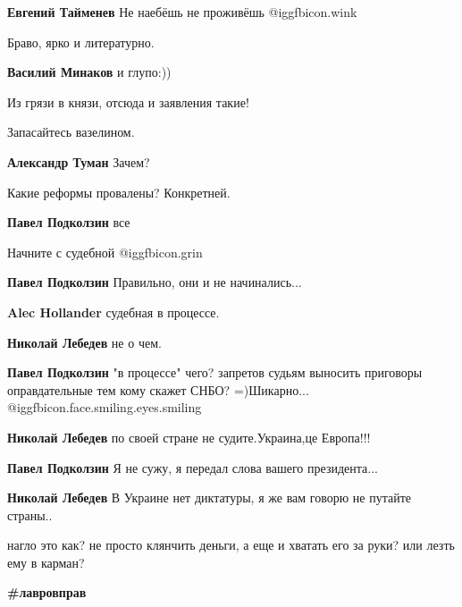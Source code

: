 \begin{itemize}
\begin{itemize}
\textbf{Евгений Тайменев} Не наебёшь не проживёшь  @igg{fbicon.wink} 
\end{itemize} %

Браво, ярко и литературно.

\begin{itemize} %
\textbf{Василий Минаков} и глупо:))
\end{itemize} %

Из грязи в князи, отсюда и заявления такие!

Запасайтесь вазелином.

\begin{itemize} %
\textbf{Александр Туман} Зачем?
\end{itemize} %

Какие реформы провалены? Конкретней.

\begin{itemize} %
\textbf{Павел Подколзин} все

Начните с судебной  @igg{fbicon.grin} 

\textbf{Павел Подколзин} Правильно, они и не начинались...

\textbf{Alec Hollander} судебная в процессе.

\textbf{Николай Лебедев} не о чем.

\textbf{Павел Подколзин} "в процессе" чего? запретов судьям выносить приговоры оправдательные тем кому скажет СНБО? =)Шикарно... @igg{fbicon.face.smiling.eyes.smiling} 

\textbf{Николай Лебедев} по своей стране не судите.Украина,це Европа!!!

\textbf{Павел Подколзин} Я не сужу, я передал слова вашего президента...

\textbf{Николай Лебедев} В Украине нет диктатуры, я же вам говорю не путайте страны..
\end{itemize} %

нагло это как? не просто клянчить деньги, а еще и хватать его за руки? или
лезть ему в карман?

\textbf{\#лавровправ}



\end{itemize}
